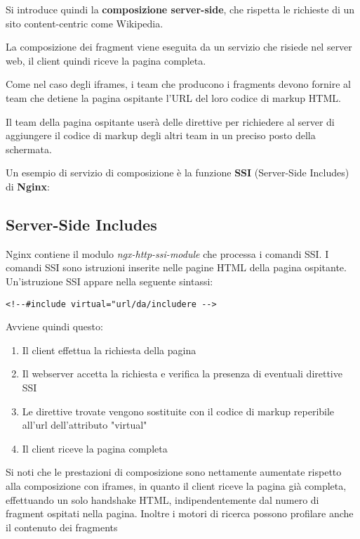 Si introduce quindi la \textbf{composizione server-side}, che rispetta le richieste di un sito content-centric come Wikipedia.

La composizione dei fragment viene eseguita da un servizio che risiede nel server web, il client quindi riceve la pagina completa.

Come nel caso degli iframes, i team che producono i fragments devono fornire al team che detiene la pagina ospitante l'URL del loro codice di markup HTML.

Il team della pagina ospitante userà delle direttive 
per richiedere al server di aggiungere il codice di markup degli altri team in un preciso posto della schermata.

Un esempio di servizio di composizione è la funzione \textbf{SSI} (Server-Side Includes) di \textbf{Nginx}:

\subsection*{Server-Side Includes}

Nginx contiene il modulo \emph{ngx-http-ssi-module} che processa i comandi SSI.
 I comandi SSI sono istruzioni
inserite nelle pagine HTML della pagina ospitante. Un'istruzione SSI appare nella seguente sintassi:

   \begin{center}
    \verb|<!--#include virtual="url/da/includere -->|
   \end{center}

Avviene quindi questo:

\begin{enumerate}
    \item Il client effettua la richiesta della pagina
    \item Il webserver accetta la richiesta e verifica la presenza di eventuali direttive SSI
    \item Le direttive trovate vengono sostituite con il codice di markup reperibile all'url dell'attributo "virtual"
    \item Il client riceve la pagina completa
\end{enumerate}

Si noti che le prestazioni di composizione sono nettamente aumentate rispetto alla composizione con iframes, 
in quanto il client riceve la pagina già completa, effettuando un solo handshake HTML, indipendentemente dal numero
di fragment ospitati nella pagina. Inoltre i motori di ricerca possono profilare anche il contenuto dei fragments

